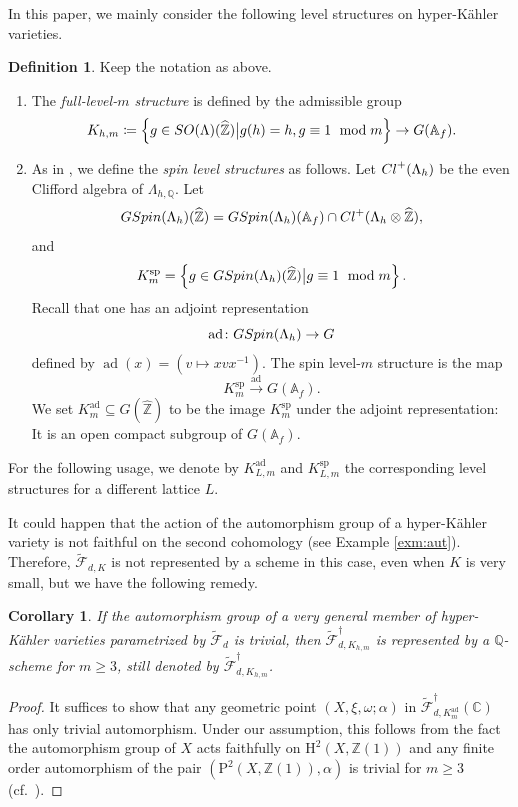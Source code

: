 \documentclass[11pt,reqno,oneside]{amsart}
\numberwithin{equation}{section}
\newtheorem{corollary}[theorem]{Corollary}
\theoremstyle{definition}
\newtheorem{definition}[theorem]{Definition}
\DeclareMathOperator{\ad}{ad}
\newcommand{\Cl}{{\rm Cl}}
\newcommand{\SO}{{\rm SO}}
\newcommand{\GSpin}{{\rm GSpin}}
\newcommand{\scF}{\mathscr{F}}
\newcommand\rH{\mathrm{H}}
\newcommand\rP{\mathrm{P}}
\newcommand{\CC}{\mathbb{C}}
\newcommand{\QQ}{\mathbb{Q}}
\newcommand{\ZZ}{\mathbb{Z}}
\begin{document}
In this paper, we mainly consider the following level structures on hyper-Kähler varieties.
\begin{definition}\label{def:levelstructures}
Keep the notation as above.
\begin{enumerate}
   \item The \emph{full-level-$m$ structure} is defined by the admissible group\[K_{h,m} \coloneqq \left\{g \in \SO(\Lambda)(\widehat{\ZZ}) \big|g(h) = h, g \equiv 1~\bmod m\right\} \to G(\mathbb{A}_f).\]
  \item 
 As in \cite{Riz10}, we define the {\it spin level structures} as follows.
Let $\Cl^{+}(\Lambda_h)$ be the even Clifford algebra of $\Lambda_{h,\QQ}$.
Let
\[
\GSpin(\Lambda_h)(\widehat{\ZZ})=\GSpin(\Lambda_h)(\mathbb{A}_f)\cap \Cl^+(\Lambda_h\otimes \widehat{\ZZ}), 
\]
and
\[
K_m^{\operatorname{sp}}= \left\{g \in \GSpin(\Lambda_h)(\widehat{\ZZ}) \big| g \equiv 1~\bmod m\right\}.
\]
Recall that one has an adjoint representation
\[
\ad \colon \GSpin(\Lambda_h) \to G
\]
defined by $ \ad(x) = (v\mapsto xvx^{-1})$. The spin level-$m$ structure is the map
\[
K_m^{\operatorname{sp}} \xrightarrow{\ad} G(\mathbb{A}_f).
\]
We set $K^{\ad}_{m}\subseteq G(\widehat{\ZZ})$ to be the image $K_m^{\operatorname{sp}}$ under the adjoint representation: It is an open compact subgroup of $G(\mathbb{A}_f)$.
\end{enumerate}
For the following usage, we denote by $K^{\ad}_{L,m}$ and $K^{\operatorname{sp}}_{L,m}$  the corresponding level structures for a different lattice $L$.
\end{definition}


It could happen that the action of the automorphism group of a hyper-Kähler variety is not faithful on the second cohomology (see Example \ref{exm:aut}). Therefore, $\widetilde{\scF}_{d,K}$ is not represented by a scheme in this case, even when $K$ is very small, but we have the following remedy. 
\begin{corollary}
If the automorphism group of a very general member of hyper-Kähler varieties parametrized by $\widetilde{\scF}_{d}$ is trivial, then $\widetilde{\scF}_{d,K_{h,m}}^{\dag}$ is represented by a $\QQ$-scheme for $m\geq 3$, still denoted by $\widetilde{\mathcal{F}}_{d,K_{h,m}}^{\dag}$.
\end{corollary}
\begin{proof}It suffices to show that any geometric point $ (X, \xi,\omega; \alpha)$ in $\widetilde{\scF}_{d,K^{\ad}_{m}}^{\dag}(\CC)$ has only trivial automorphism.  Under our assumption, this follows from the fact the automorphism group of $X$ acts faithfully on $\rH^2(X,\ZZ(1))$ and any finite order automorphism of the pair $(\rP^2(X,\ZZ(1)), \alpha)$  is trivial for $m \geq 3$ (cf.~\cite[Lemma 1.5.12]{Ri06}). 
\end{proof}
\end{document}
